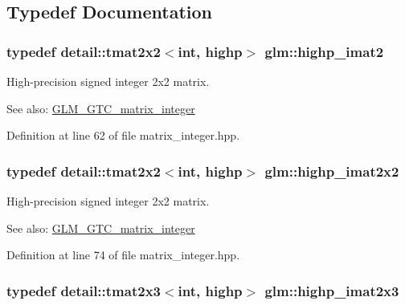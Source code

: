 \subsection{Typedef Documentation}
\hypertarget{group__gtc__matrix__integer_g70eae282157f23589db24f4664bbf956}{
\subsubsection[highp\_\-imat2]{\setlength{\rightskip}{0pt plus 5cm}typedef detail::tmat2x2$<$int, highp$>$ {\bf glm::highp\_\-imat2}}}
\label{group__gtc__matrix__integer_g70eae282157f23589db24f4664bbf956}


High-precision signed integer 2x2 matrix. \begin{Desc}
\item[See also:]\hyperlink{group__gtc__matrix__integer}{GLM\_\-GTC\_\-matrix\_\-integer} \end{Desc}


Definition at line 62 of file matrix\_\-integer.hpp.\hypertarget{group__gtc__matrix__integer_g9646ff5ef973234755e63e727c5a37fc}{
\subsubsection[highp\_\-imat2x2]{\setlength{\rightskip}{0pt plus 5cm}typedef detail::tmat2x2$<$int, highp$>$ {\bf glm::highp\_\-imat2x2}}}
\label{group__gtc__matrix__integer_g9646ff5ef973234755e63e727c5a37fc}


High-precision signed integer 2x2 matrix. \begin{Desc}
\item[See also:]\hyperlink{group__gtc__matrix__integer}{GLM\_\-GTC\_\-matrix\_\-integer} \end{Desc}


Definition at line 74 of file matrix\_\-integer.hpp.\hypertarget{group__gtc__matrix__integer_g7b7079ab95ac8f533ac565fcf1341c76}{
\subsubsection[highp\_\-imat2x3]{\setlength{\rightskip}{0pt plus 5cm}typedef detail::tmat2x3$<$int, highp$>$ {\bf glm::highp\_\-imat2x3}}}
\label{group__gtc__matrix__integer_g7b7079ab95ac8f533ac565fcf1341c76}


